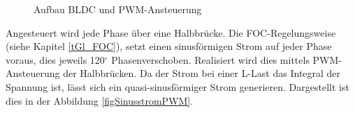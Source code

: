 \begin{figure} [H]
	\caption[BLDC Motor]{Aufbau BLDC und PWM-Ansteuerung}
	\label{fig:BLDC}
\end{figure}

Angesteuert wird jede Phase über eine Halbbrücke. Die FOC-Regelungsweise (siehe Kapitel \ref{tGl_FOC}), setzt einen sinusförmigen Strom auf jeder Phase voraus, dies jeweils 120\(^\circ\) Phasenverschoben.  Realisiert wird dies mittels PWM-Ansteuerung der Halbbrücken. Da der Strom bei einer L-Last das Integral der Spannung ist, lässt sich ein quasi-sinusförmiger Strom generieren. Dargestellt ist dies in der Abbildung \ref{figSinusstromPWM}.

